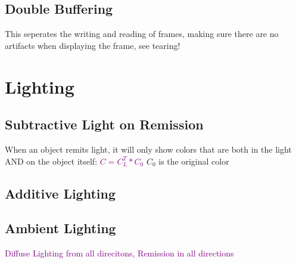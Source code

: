 \documentclass[main.tex,fontsize=12pt,paper=a4,paper=landscape,DIV=calc,]{scrartcl}
\begin{document}
\begin{multicols*}{4}
\subsection{Double Buffering}
This seperates the writing and reading of frames, making sure there are no artifacts when displaying the frame, see tearing!

\section{Lighting}
\subsection{Subtractive Light on Remission}
When an object remits light, it will only show colors that are both in the light AND on the object itself:\newline
\textcolor{purple}{\(C = C_L^T * C_0\)}\newline
\(C_0\) is the original color

\subsection{Additive Lighting}

\subsection{Ambient Lighting}
\textcolor{purple}{Diffuse Lighting from all direcitons, Remission in all directions}

\end{multicols*}
\end{document}
